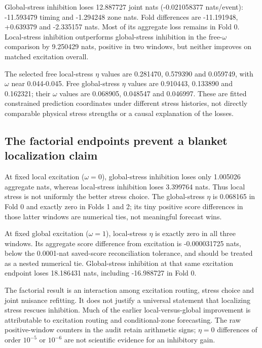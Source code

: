 Global-stress inhibition loses 12.887727 joint nats (-0.021058377 nats/event): -11.593479 timing and -1.294248 zone nats. Fold differences are -11.191948, +0.639379 and -2.335157 nats. Most of its aggregate loss remains in Fold 0. Local-stress inhibition outperforms global-stress inhibition in the free-$\omega$ comparison by 9.250429 nats, positive in two windows, but neither improves on matched excitation overall.

The selected free local-stress $\eta$ values are 0.281470, 0.579390 and 0.059749, with $\omega$ near 0.044-0.045. Free global-stress $\eta$ values are 0.910443, 0.133890 and 0.162321; their $\omega$ values are 0.068905, 0.048547 and 0.046997. These are fitted constrained prediction coordinates under different stress histories, not directly comparable physical stress strengths or a causal explanation of the losses.

\subsection{The factorial endpoints prevent a blanket localization claim}

At fixed local excitation ($\omega=0$), global-stress inhibition loses only 1.005026 aggregate nats, whereas local-stress inhibition loses 3.399764 nats. Thus local stress is not uniformly the better stress choice. The global-stress $\eta$ is 0.068165 in Fold 0 and exactly zero in Folds 1 and 2; its tiny positive score differences in those latter windows are numerical ties, not meaningful forecast wins.

At fixed global excitation ($\omega=1$), local-stress $\eta$ is exactly zero in all three windows. Its aggregate score difference from excitation is -0.000031725 nats, below the 0.0001-nat saved-score reconciliation tolerance, and should be treated as a nested numerical tie. Global-stress inhibition at that same excitation endpoint loses 18.186431 nats, including -16.988727 in Fold 0.

The factorial result is an interaction among excitation routing, stress choice and joint nuisance refitting. It does not justify a universal statement that localizing stress rescues inhibition. Much of the earlier local-versus-global improvement is attributable to excitation routing and conditional-zone forecasting. The raw positive-window counters in the audit retain arithmetic signs; $\eta=0$ differences of order $10^{-5}$ or $10^{-6}$ are not scientific evidence for an inhibitory gain.


